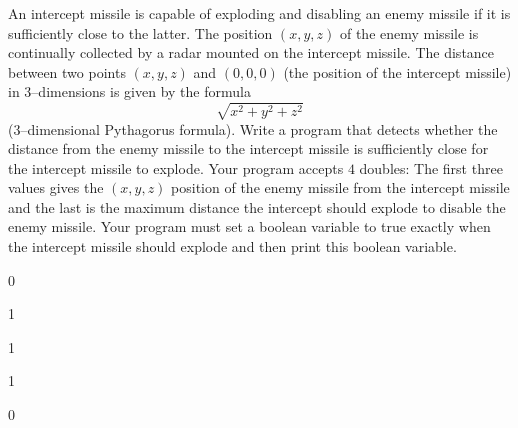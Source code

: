 An intercept missile is capable of exploding and disabling an enemy missile if
it is sufficiently close to the latter. The position $(x,y,z)$ of the enemy
missile is continually collected by a radar mounted on the intercept missile.
The distance between two points $(x,y,z)$ and $(0,0,0)$ (the position of the
intercept missile) in $3$--dimensions is given by the formula
\[\sqrt{x^2 + y^2 + z^2}\]
($3$--dimensional Pythagorus formula). Write a program that detects whether the
distance from the enemy missile to the intercept missile is sufficiently close
for the intercept missile to explode. Your program accepts $4$ doubles: The
first three values gives the $(x,y,z)$ position of the enemy missile from the
intercept missile and the last is the maximum distance the intercept should
explode to disable the enemy missile. Your program must set a boolean variable
to true exactly when the intercept missile should explode and then print this
boolean variable.

\resett
\nextt
\begin{console}[commandchars=\\\{\}]
0
\end{console}

\nextt
\begin{console}[commandchars=\\\{\}]
1
\end{console}

\nextt
\begin{console}[commandchars=\\\{\}]
1
\end{console}

\nextt
\begin{console}[commandchars=\\\{\}]
1
\end{console}

\nextt
\begin{console}[commandchars=\\\{\}]
0
\end{console}
